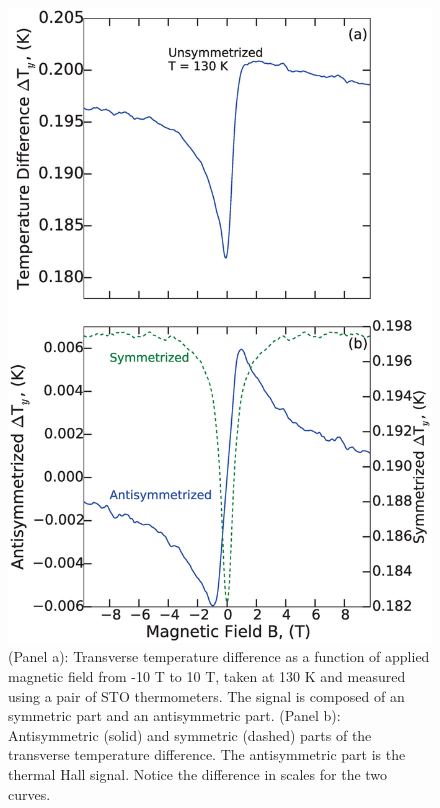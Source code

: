 \documentclass{thesis-umich}
\begin{document}
\begin{figure}\centering \caption[Transverse temperature gradient of a bismuth crystal]{(Panel a): Transverse temperature difference as a
    function of applied magnetic field from -10 T to 10 T, taken at 130 K and
    measured using a pair of STO thermometers. The signal is composed of an
    symmetric part and an antisymmetric part.  (Panel b): Antisymmetric (solid)
  and symmetric (dashed) parts of the transverse temperature difference. The
antisymmetric part is the thermal Hall signal. Notice the difference in scales
for the two curves.} \label{fig:t_grad}
\includegraphics[width=0.9\columnwidth]{figures/rawCurve_apl.eps} \end{figure}
\end{document}

